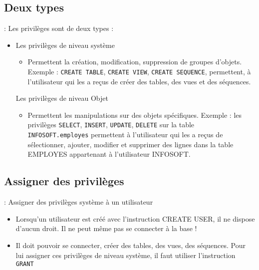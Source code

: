 \documentclass[10pt]{beamer}
\begin{document}
\subsection{Deux types}
\begin{frame}{\secname : \subsecname}
    Les privilèges sont de deux types :
    \begin{itemize}
        \item Les privilèges de niveau système
              \begin{itemize}
                  \item Permettent la création, modification, suppression de groupes d'objets.
                        Exemple : \lstinline[language=plsql]!CREATE TABLE!, \lstinline[language=plsql]!CREATE VIEW!, \lstinline[language=plsql]!CREATE SEQUENCE!, permettent, à l'utilisateur qui les a reçus de créer des tables, des vues et des séquences.
              \end{itemize}
              Les privilèges de niveau Objet
              \begin{itemize}
                  \item Permettent les manipulations sur des objets spécifiques.
                        Exemple : les privilèges \lstinline[language=plsql]!SELECT!, \lstinline[language=plsql]!INSERT!, \lstinline[language=plsql]!UPDATE!, \lstinline[language=plsql]!DELETE! sur la table \lstinline[language=plsql]!INFOSOFT.employes! permettent à l'utilisateur qui les a reçus de sélectionner, ajouter, modifier et supprimer des lignes dans la table EMPLOYES appartenant à l'utilisateur INFOSOFT.
              \end{itemize}
    \end{itemize}
\end{frame}

\subsection{Assigner des privilèges}
\begin{frame}{\secname : \subsecname}
    Assigner des privilèges système à un utilisateur
    \begin{itemize}
        \item Lorsqu'un utilisateur est créé avec l'instruction CREATE USER, il ne dispose d'aucun droit.  Il ne peut même pas se connecter à la base !
        \item Il doit pouvoir se connecter, créer des tables, des vues, des séquences.  Pour lui assigner ces privilèges de niveau système, il faut utiliser l'instruction \lstinline[language=plsql]!GRANT!
    \end{itemize}
\end{frame}
\end{document}
